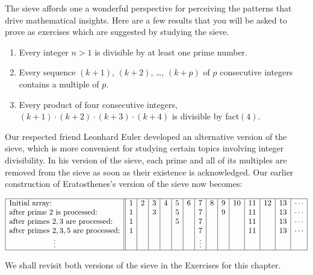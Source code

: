 \bigskip

The sieve affords one a wonderful perspective for perceiving the patterns that drive mathematical insights.  Here are a few results that you will be asked to prove as exercises which are suggested by studying the sieve.
{\em
\begin{enumerate}
\item
Every integer $n > 1$ is divisible by at least one prime number.
\medskip\item
Every sequence $(k+1)$, $(k+2)$, \ldots , $(k+p)$ of $p$ consecutive integers contains a multiple of $p$.
\medskip\item
Every product of four consecutive integers, $(k+1) \cdot (k+2) \cdot (k+3) \cdot (k+4)$ is divisible by {\sc fact}$(4)$.
\end{enumerate}
}

\medskip

Our respected friend Leonhard Euler developed an alternative version of the sieve, which is more convenient for studying certain topics involving integer divisibility.  In his version of the sieve, each prime and all of its multiples are removed from the sieve as soon as their existence is acknowledged.  Our earlier construction of Eratosthenes's version of the sieve now becomes:


\bigskip

\hspace*{.25in}$\begin{array}{|l||c|c|c|c|c|c|c|c|c|c|c|c|c|c|}
\hline
\mbox{Initial array:} &
1 & 2 & 3 & 4 & 5 & 6 & 7 & 8 & 9 & 10 & 11 & 12 & 13 & \cdots \\
\mbox{after prime $2$ is processed:} &
1 &  & 3 &  & 5 &  & 7 &  & 9 &  & 11 &  & 13 & \cdots \\
\mbox{after primes $2, 3$ are processed:} &
1 &  &  &  & 5 &  & 7 &  &  &  & 11 &  & 13 & \cdots \\
\mbox{after primes $2, 3, 5$ are processed:} &
1 &  &  &  &  &  & 7 &  &  &  & 11 &  & 13 & \cdots \\
\hspace*{.8in} \vdots  &
 &  &  &  &  &  & \vdots &  &  &  &  &  &  & \\
\hline
\end{array}$

\bigskip

We shall revisit both versions of the sieve in the Exercises for this chapter.


